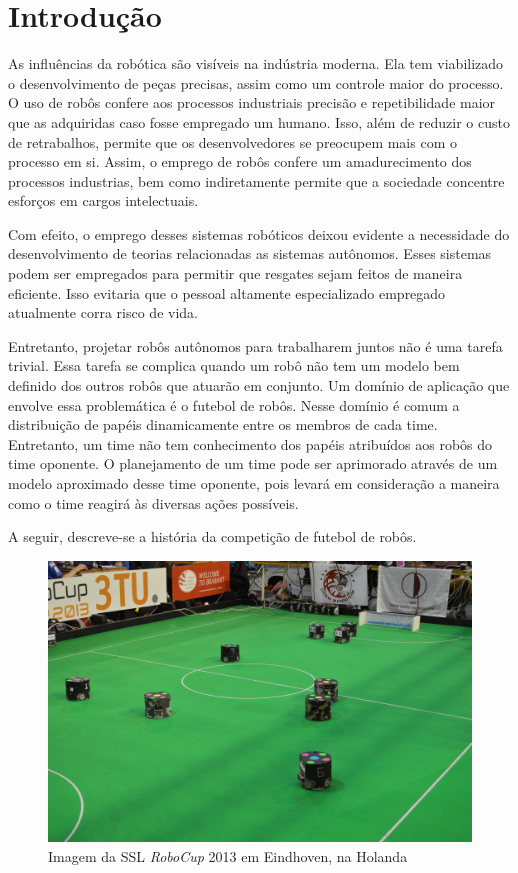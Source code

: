 \chapter{Introdução}


As influências da robótica
são visíveis na indústria moderna. Ela tem viabilizado o desenvolvimento de peças
precisas, assim como um controle maior do processo. O uso de robôs confere aos
processos industriais precisão e repetibilidade maior que as adquiridas caso
fosse empregado um humano. Isso, além de reduzir o custo de retrabalhos, permite
que os desenvolvedores se preocupem mais com o processo em si. Assim, o emprego
de robôs confere um amadurecimento dos processos industrias, bem como indiretamente
permite que a sociedade concentre esforços em cargos intelectuais.

Com efeito, o emprego desses sistemas robóticos deixou evidente a necessidade do
desenvolvimento de teorias relacionadas as sistemas autônomos. Esses sistemas podem
ser empregados para permitir que resgates sejam feitos de maneira eficiente. Isso
evitaria que o pessoal altamente especializado empregado atualmente corra risco de vida.

Entretanto, projetar robôs autônomos para trabalharem juntos não é uma tarefa trivial. Essa
tarefa se complica quando um robô não tem um modelo bem definido dos outros robôs que atuarão em
conjunto. Um domínio de aplicação que envolve essa problemática é o futebol de robôs.
Nesse domínio é comum a distribuição de papéis dinamicamente entre os membros de cada
time. Entretanto, um time não tem conhecimento dos papéis atribuídos aos robôs
do time oponente. O planejamento de um time pode ser aprimorado através de um modelo
aproximado desse time oponente, pois levará em consideração a maneira como o
time reagirá às diversas ações possíveis.

A seguir, descreve-se a história da competição de futebol de robôs.

\begin{figure}
  \includegraphics[width = \linewidth]{figuras/robocup2013}
  \caption{Imagem da SSL \textit{RoboCup} 2013 em Eindhoven, na Holanda}\label{fig:robocup2013}
\end{figure}

